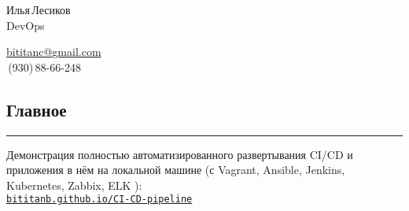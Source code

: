 \documentclass[11pt, a4paper]{article}
\newcommand{\Delimitline}{
  \vspace{-2ex}
  {\rule{\linewidth}{0.13ex}}
}
\newcommand\rurl[1]{%
  \href{http://#1}{\nolinkurl{#1}}%
}
\newcommand\Eng[1]{%
  \foreignlanguage{english}{#1}%
}
\begin{document}
\sffamily

\pagecolor[RGB]{245,245,245}

{\setlength\multicolsep{0pt}%
\begin{multicols}{2}

\begin{spacing}{1.5}
  {\LARGE Илья\,Лесиков}\\
  {\Large\Eng{DevOps}}\hspace{1.3cm}{\large 25\,лет}
\end{spacing}

\columnbreak

\begin{flushright}
  \begin{spacing}{1.3}
    {\large\href{mailto:bititanc@gmail.com}{\Eng{bititanc@gmail.com}}}\\
    {\fontsize{1.4em}{0}\,(930)\,88-66-248} \normalsize\\
  \end{spacing}
\end{flushright}

\end{multicols}
}


\vspace{3ex}

\begin{comment}
У меня нет образования (неоконченный колледж электроники) и сомнительный стаж (10 месяцев сисадмином).\\
Но, самообучаясь, за последние пару лет я получил достаточный опыт и в общей автоматизации, и в \Eng{CI/CD}.\\
Получил некоторый опыт и в кодинге, как и хороший общий технический бэкграунд (\Eng{Linux}, сети и т.\,п.).
\end{comment}


\subsection*{Главное}
\Delimitline
Демонстрация полностью автоматизированного развертывания \Eng{CI/CD} и приложения в нём на локальной машине 
(с \Eng{Vagrant, Ansible, Jenkins, Kubernetes, Zabbix, ELK}):\\
\rurl{bititanb.github.io/CI-CD-pipeline}
\end{document}
